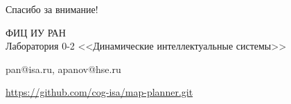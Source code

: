 \documentclass[default]{beamer}
\begin{document}
\begin{frame}
\begin{columns}
		\end{columns}
		\vspace{-5pt}
		\nocite{*}
		\printbibliography[keyword={strl}, resetnumbers=true]
	\end{frame}
		
	\begin{frame}
		\centering
		\Huge
		Спасибо за внимание!
		\normalsize
		\par\bigskip
		\par\bigskip
		ФИЦ ИУ РАН\\Лаборатория 0-2 <<Динамические интеллектуальные системы>>
		
		\par\bigskip
		pan@isa.ru, apanov@hse.ru
		\par\bigskip
		\url{https://github.com/cog-isa/map-planner.git}
	\end{frame}			
\end{document}
